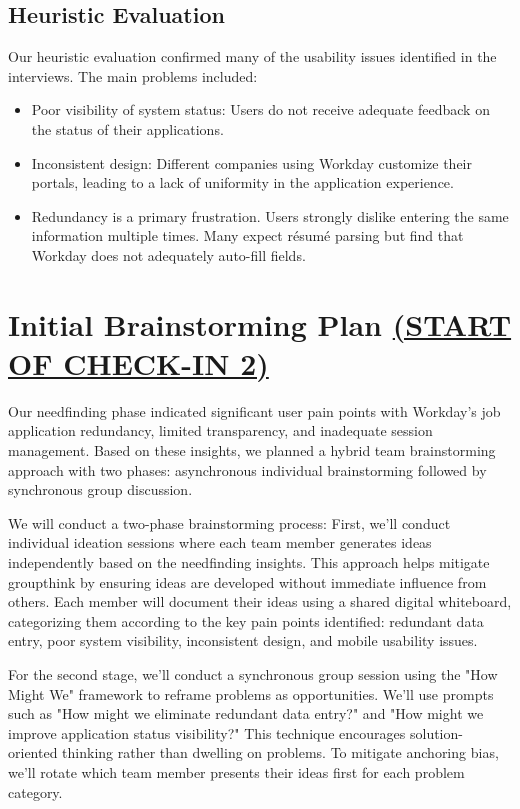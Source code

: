 \documentclass[
	letterpaper, %
]{jdf}
\begin{document}
\subsection{Heuristic Evaluation}
Our heuristic evaluation confirmed many of the usability issues identified in the interviews. The main problems included:
\begin{itemize}
\item Poor visibility of system status: Users do not receive adequate feedback on the status of their applications.
\item Inconsistent design: Different companies using Workday customize their portals, leading to a lack of uniformity in the application experience.
\item Redundancy is a primary frustration. Users strongly dislike entering the same information multiple times. Many expect résumé parsing but find that Workday does not adequately auto-fill fields.
\end{itemize}


\newpage

\section{Initial Brainstorming Plan \underline{(START OF CHECK-IN 2)}}
Our needfinding phase indicated significant user pain points with Workday's job application redundancy, limited transparency, and inadequate session management. Based on these insights, we planned a hybrid team brainstorming approach with two phases: asynchronous individual brainstorming followed by synchronous group discussion.

We will conduct a two-phase brainstorming process: First, we'll conduct individual ideation sessions where each team member generates ideas independently based on the needfinding insights. This approach helps mitigate groupthink by ensuring ideas are developed without immediate influence from others. Each member will document their ideas using a shared digital whiteboard, categorizing them according to the key pain points identified: redundant data entry, poor system visibility, inconsistent design, and mobile usability issues.

For the second stage, we'll conduct a synchronous group session using the "How Might We" framework to reframe problems as opportunities. We'll use prompts such as "How might we eliminate redundant data entry?" and "How might we improve application status visibility?" This technique encourages solution-oriented thinking rather than dwelling on problems. To mitigate anchoring bias, we'll rotate which team member presents their ideas first for each problem category.
\end{document}

